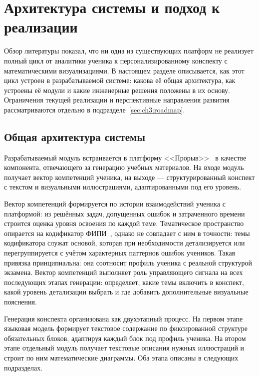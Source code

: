 \section{Архитектура системы и подход к реализации}
\label{sec:architecture}

Обзор литературы показал, что ни одна из существующих платформ не реализует
полный цикл от аналитики ученика к персонализированному конспекту с
математическими визуализациями. В настоящем разделе описывается, как этот
цикл устроен в разрабатываемой системе: какова её общая архитектура, как
устроены её модули и какие инженерные решения положены в их основу.
Ограничения текущей реализации и перспективные направления развития
рассматриваются отдельно в подразделе~\ref{sec:ch3:roadmap}.

\subsection{Общая архитектура системы}

Разрабатываемый модуль встраивается в платформу <<Прорыв>>~\cite{Proriv}
в качестве компонента, отвечающего за генерацию учебных материалов.
На входе модуль получает вектор компетенций ученика, на выходе ---
структурированный конспект с текстом и визуальными иллюстрациями,
адаптированными под его уровень.

Вектор компетенций формируется по истории взаимодействий ученика с платформой:
из решённых задач, допущенных ошибок и затраченного времени строится оценка
уровня освоения по каждой теме. Тематическое пространство опирается на
кодификатор ФИПИ~\cite{FIPI2025Demo}, однако не совпадает с ним в точности:
темы кодификатора служат основой, которая при необходимости детализируется
или перегруппируется с учётом характерных паттернов ошибок учеников.
Такая привязка принципиальна: она соотносит профиль ученика с реальной
структурой экзамена. Вектор компетенций выполняет роль управляющего сигнала
на всех последующих этапах генерации: определяет, какие темы включить в
конспект, какой уровень детализации выбрать и где добавить дополнительные
визуальные пояснения.

Генерация конспекта организована как двухэтапный процесс. На первом этапе
языковая модель формирует текстовое содержание по фиксированной структуре
обязательных блоков, адаптируя каждый блок под профиль ученика. На втором
этапе отдельный модуль получает текстовые описания нужных иллюстраций и
строит по ним математические диаграммы. Оба этапа описаны в следующих
подразделах.

